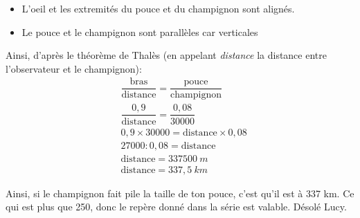 \cnt 
\begin{itemize}
  \item L'oeil et les extremités du pouce et du champignon sont alignés.
  \item Le pouce et le champignon sont parallèles car verticales
\end{itemize}
Ainsi, d'après le théorème de Thalès (en appelant \textit{distance} la distance entre l'observateur et le champignon):
\begin{align*}
  &\dfrac{\text{bras}}{\text{distance}}=\dfrac{\text{pouce}}{\text{champignon}}\\
  &\dfrac{0,9}{\text{distance}}=\dfrac{0,08}{30 000}\\
  &0,9\times 30 000= \text{distance}\times 0,08\\
  &27 000 : 0,08 = \text{distance}\\
  &\text{distance} = 337 500~m\\
  &\text{distance} = 337,5~km
\end{align*}

Ainsi, si le champignon fait pile la taille de ton pouce, c'est qu'il est à 337 km. Ce qui est plus que 250, donc le repère donné dans la série est valable. Désolé Lucy.